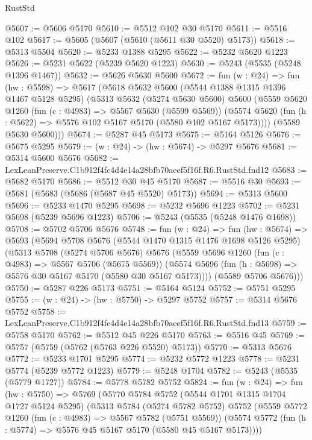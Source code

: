 \begin{lexlean}{RustStd}
\begin{coremodule}
@5607 := @5606 @5170
@5610 := @5512 @102 @30 @5170
@5611 := @5516 @102
@5617 := @5605 (@5607 (@5610 (@5611 @30 @5520) @5173))
@5618 := @5313 @5504
@5620 := @5233 @1388 @5295
@5622 := @5232 @5620 @1223
@5626 := @5231 @5622 (@5239 @5620 @1223)
@5630 := @5243 (@5535 (@5248 @1396 @1467))
@5632 := @5626 @5630 @5600
@5672 := fun (w : @24) =>
  fun (hw : @5598) =>
  @5617
    (@5618
      @5632
      @5600
      (@5544 @1388 @1315 @1396 @1467 @5128 @5295)
      (@5313
        @5632
        (@5274 @5630 @5600)
        @5600
        (@5559
          @5620
          @1260
          (fun (c : @4983) => @5567 @5630 (@5599 @5569))
          (@5574 @5620 (fun (h : @5622) => @5576 @102 @5167 @5170 (@5580 @102 @5167 @5173))))
        (@5589 @5630 @5600)))
@5674 := @5287 @45 @5173
@5675 := @5164 @5126
@5676 := @5675 @5295
@5679 := (w : @24) -> (hw : @5674) -> @5297 @5676
@5681 := @5314 @5600 @5676
@5682 := LexLeanPreserve.C1b912f4fc4d4e14a28bfb70aeef5f16f.R6.RustStd.fnd12
@5683 := @5682 @5170
@5686 := @5512 @30 @45 @5170
@5687 := @5516 @30
@5693 := @5681 (@5683 (@5686 (@5687 @45 @5520) @5173))
@5694 := @5313 @5600
@5696 := @5233 @1470 @5295
@5698 := @5232 @5696 @1223
@5702 := @5231 @5698 (@5239 @5696 @1223)
@5706 := @5243 (@5535 (@5248 @1476 @1698))
@5708 := @5702 @5706 @5676
@5748 := fun (w : @24) =>
  fun (hw : @5674) =>
  @5693
    (@5694
      @5708
      @5676
      (@5544 @1470 @1315 @1476 @1698 @5126 @5295)
      (@5313
        @5708
        (@5274 @5706 @5676)
        @5676
        (@5559
          @5696
          @1260
          (fun (c : @4983) => @5567 @5706 (@5675 @5569))
          (@5574 @5696 (fun (h : @5698) => @5576 @30 @5167 @5170 (@5580 @30 @5167 @5173))))
        (@5589 @5706 @5676)))
@5750 := @5287 @226 @5173
@5751 := @5164 @5124
@5752 := @5751 @5295
@5755 := (w : @24) -> (hw : @5750) -> @5297 @5752
@5757 := @5314 @5676 @5752
@5758 := LexLeanPreserve.C1b912f4fc4d4e14a28bfb70aeef5f16f.R6.RustStd.fnd13
@5759 := @5758 @5170
@5762 := @5512 @45 @226 @5170
@5763 := @5516 @45
@5769 := @5757 (@5759 (@5762 (@5763 @226 @5520) @5173))
@5770 := @5313 @5676
@5772 := @5233 @1701 @5295
@5774 := @5232 @5772 @1223
@5778 := @5231 @5774 (@5239 @5772 @1223)
@5779 := @5248 @1704
@5782 := @5243 (@5535 (@5779 @1727))
@5784 := @5778 @5782 @5752
@5824 := fun (w : @24) =>
  fun (hw : @5750) =>
  @5769
    (@5770
      @5784
      @5752
      (@5544 @1701 @1315 @1704 @1727 @5124 @5295)
      (@5313
        @5784
        (@5274 @5782 @5752)
        @5752
        (@5559
          @5772
          @1260
          (fun (c : @4983) => @5567 @5782 (@5751 @5569))
          (@5574 @5772 (fun (h : @5774) => @5576 @45 @5167 @5170 (@5580 @45 @5167 @5173))))

\end{coremodule}
\end{lexlean}

